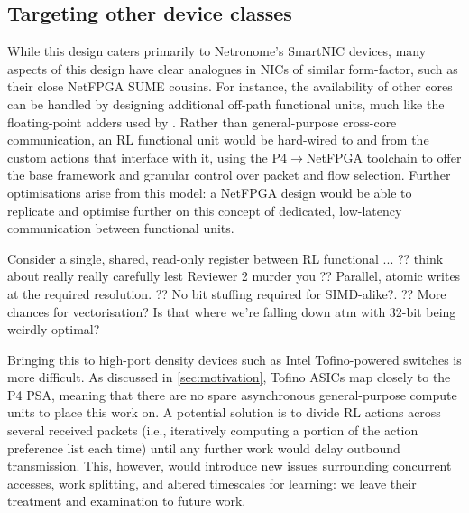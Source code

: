 \documentclass[sigconf,natbib=false]{acmart}
\begin{document}
\subsection{Targeting other device classes}
While this design caters primarily to Netronome's SmartNIC devices, many aspects of this design have clear analogues in NICs of similar form-factor, such as their close NetFPGA SUME cousins.
For instance, the availability of other cores can be handled by designing additional off-path functional units, much like the floating-point adders used by \textcite{DBLP:conf/isca/LiLYCSH19}.
Rather than general-purpose cross-core communication, an RL functional unit would be hard-wired to and from the custom actions that interface with it, using the P4$\rightarrow$NetFPGA toolchain to offer the base framework and granular control over packet and flow selection.
Further optimisations arise from this model: a NetFPGA design would be able to replicate and optimise further on this concept of dedicated, low-latency communication between functional units.

Consider a single, shared, read-only register between RL functional ...
?? think about really really carefully lest Reviewer 2 murder you
?? Parallel, atomic writes at the required resolution.
?? No bit stuffing required for SIMD-alike?.
?? More chances for vectorisation? Is that where we're falling down atm with 32-bit being weirdly optimal?

Bringing this to high-port density devices such as Intel Tofino-powered switches is more difficult.
As discussed in \cref{sec:motivation}, Tofino ASICs map closely to the P4 PSA, meaning that there are no spare asynchronous general-purpose compute units to place this work on.
A potential solution is to divide RL actions across several received packets (i.e., iteratively computing a portion of the action preference list each time) until any further work would delay outbound transmission.
This, however, would introduce new issues surrounding concurrent accesses, work splitting, and altered timescales for learning: we leave their treatment and examination to future work.
\end{document}
